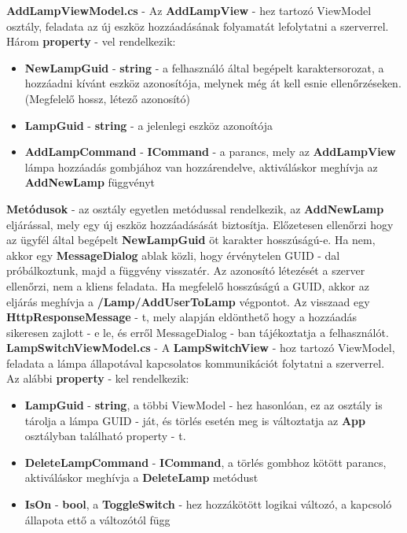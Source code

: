 \documentclass[a4paper,12pt]{report}
\begin{document}
    \textbf{AddLampViewModel.cs} - Az \textbf{AddLampView} - hez tartozó ViewModel osztály, feladata az új eszköz hozzáadásának
    folyamatát lefolytatni a szerverrel.\\
    Három \textbf{property} - vel rendelkezik:

\begin{itemize}
    \item \textbf{NewLampGuid} - \textbf{string} - a felhasználó által begépelt karaktersorozat, a hozzáadni kívánt eszköz azonosítója,
    melynek még át kell esnie ellenőrzéseken. (Megfelelő hossz, létező azonosító)
    \item \textbf{LampGuid} - \textbf{string} - a jelenlegi eszköz azonoítója
    \item \textbf{AddLampCommand} - \textbf{ICommand} - a parancs, mely az \textbf{AddLampView} lámpa hozzáadás gombjához van hozzárendelve,
    aktiváláskor meghívja az \textbf{AddNewLamp} függvényt
\end{itemize}

    \textbf{Metódusok} - az osztály egyetlen metódussal rendelkezik, az \textbf{AddNewLamp} eljárással, mely egy új eszköz hozzáadásását
    biztosítja. Előzetesen ellenőrzi hogy az ügyfél által begépelt \textbf{NewLampGuid} öt karakter hosszúságú-e. Ha nem, akkor egy
    \textbf{MessageDialog} ablak közli, hogy érvénytelen GUID - dal próbálkoztunk, majd a függvény visszatér. Az azonosító létezését
    a szerver ellenőrzi, nem a kliens feladata. Ha megfelelő hosszúságú a GUID, akkor az eljárás meghívja a \textbf{/Lamp/AddUserToLamp}
    végpontot. Az visszaad egy \textbf{HttpResponseMessage} - t, mely alapján eldönthető hogy a hozzáadás sikeresen zajlott - e le, és erről
    MessageDialog - ban tájékoztatja a felhasználót.\\

    \textbf{LampSwitchViewModel.cs} - A \textbf{LampSwitchView} - hoz tartozó ViewModel, feladata a lámpa állapotával kapcsolatos
    kommunikációt folytatni a szerverrel.\\

    Az alábbi \textbf{property} - kel rendelkezik:

\begin{itemize}
    \item \textbf{LampGuid} - \textbf{string}, a többi ViewModel - hez hasonlóan, ez az osztály is tárolja a lámpa GUID - ját, és törlés
    esetén meg is változtatja az \textbf{App} osztályban található property - t.
    \item \textbf{DeleteLampCommand} - \textbf{ICommand}, a törlés gombhoz kötött parancs, aktiváláskor meghívja a \textbf{DeleteLamp} metódust
    \item \textbf{IsOn} - \textbf{bool}, a \textbf{ToggleSwitch} - hez hozzákötött logikai változó, a kapcsoló állapota ettő a változótól függ
\end{itemize}
\end{document}
